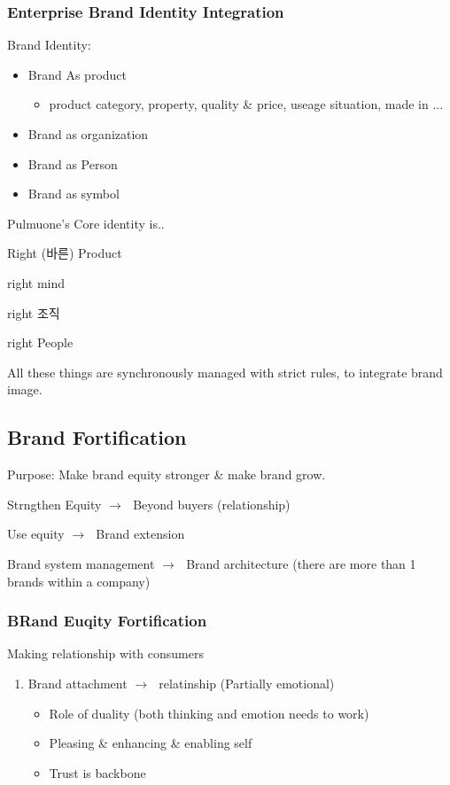 \documentclass[12pt]{article}
\newcommand{\ra}{$\rightarrow \text{ }$}
\begin{document}
\begin{itemize}
\subsubsection{Enterprise Brand Identity Integration}

Brand Identity:

\begin{itemize}
	\item Brand As product
	\begin{itemize}
		\item product category, property, quality \& price, useage situation, made in ...
	\end{itemize}
	\item Brand as organization
	\item Brand as Person
	\item Brand as symbol
\end{itemize}


Pulmuone's Core identity is..

Right (바른) Product

right mind

right 조직

right People

All these things are synchronously managed with strict rules, to integrate brand image.

\subsection{Brand Fortification}

Purpose: Make brand equity stronger & make brand grow.

Strngthen Equity \ra Beyond buyers (relationship)

Use equity \ra Brand extension

Brand system management \ra Brand architecture (there are more than 1 brands within a company)

\subsubsection{BRand Euqity Fortification}

Making relationship with consumers

\begin{enumerate}
	\item Brand attachment \ra relatinship (Partially emotional)
	\begin{itemize}
		\item Role of duality (both thinking and emotion needs to work)
		\item Pleasing & enhancing & enabling self
		\item Trust is backbone


\end{itemize}
\end{enumerate}
\end{itemize}
\end{document}
